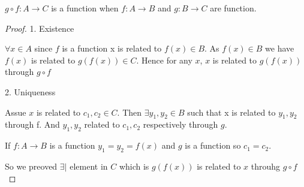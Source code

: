 \begin{theorem}
    $g \circ f: A \rightarrow C$ is a function when $f: A \rightarrow B$ and $g: B\rightarrow C $ are function.
\end{theorem}
\begin{proof}
    1. Existence 

    $\forall x \in A$ since  $f$ is a function x is related to $f(x) \in B$. As $f(x) \in B$ we have  $f(x)$ is related to $g(f(x)) \in C$. Hence for any $x$, $x$ is related to $g(f(x))$ through  $g \circ f$
    
    2. Uniqueness

    Assue $x$ is related to $c_1,c_2 \in C$. Then $\exists y_1,y_2 \in B$ such that x is related to $y_1,y_2$ through f. And $y_1,y_2$ related to $c_1,c_2$ respectively through $g$.

    If $f: A\rightarrow B$ is a function $y_1 = y_2 = f(x)$ and $g$ is a function so $c_1 = c_2$.

    So we preoved $\exists|$ element in $C$ which is $g(f(x))$ is related to  $x$ throuhg $g \circ f$
\end{proof}



